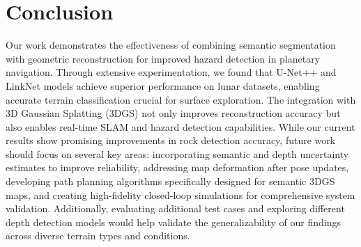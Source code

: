 \section{Conclusion}
Our work demonstrates the effectiveness of combining semantic segmentation with geometric reconstruction for improved hazard detection in planetary navigation. Through extensive experimentation, we found that U-Net++ and LinkNet models achieve superior performance on lunar datasets, enabling accurate terrain classification crucial for surface exploration. The integration with 3D Gaussian Splatting (3DGS) not only improves reconstruction accuracy but also enables real-time SLAM and hazard detection capabilities. While our current results show promising improvements in rock detection accuracy, future work should focus on several key areas: incorporating semantic and depth uncertainty estimates to improve reliability, addressing map deformation after pose updates, developing path planning algorithms specifically designed for semantic 3DGS maps, and creating high-fidelity closed-loop simulations for comprehensive system validation. Additionally, evaluating additional test cases and exploring different depth detection models would help validate the generalizability of our findings across diverse terrain types and conditions.